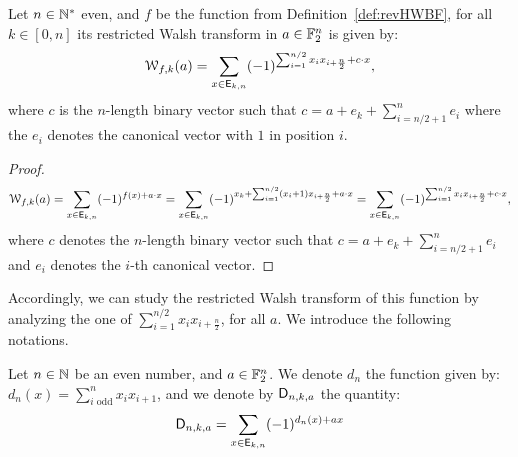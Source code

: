 \documentclass[11pt]{llncs}
\begin{document}
\begin{proposition}\label{prop:restrWT}
Let $n \in \mathbb{N}^*$ even, and $f$ be the function from Definition~\ref{def:revHWBF}, for all $k\in [0,n]$ its restricted Walsh transform in $a\in \mathbb{F}_2^n$ is given by:
\[\mathcal{W}_{f,k}(a)=\sum_{x \in \mathsf{E}_{k,n}} (-1)^{\sum_{i=1}^{n/2} x_i x_{i+\frac{n}{2}}+ c \cdot x},\]
where $c$ is the $n$-length binary vector such that $c=a+e_k+\sum_{i=n/2+1}^n e_i$ where the $e_i$ denotes the canonical vector with $1$ in position $i$.
\end{proposition}
\begin{proof}
\[	\mathcal{W}_{f,k}(a)=\sum_{x \in \mathsf{E}_{k,n}} (-1)^{f(x)+a \cdot x}
	=\sum_{x \in \mathsf{E}_{k,n}} (-1)^{x_k + \sum_{i=1}^{n/2} (x_i+1) x_{i+\frac{n}{2}}+ a \cdot x}\\
	=\sum_{x \in \mathsf{E}_{k,n}} (-1)^{\sum_{i=1}^{n/2} x_i x_{i+\frac{n}{2}}+ c \cdot x},\]
where $c$ denotes the $n$-length binary vector such that $c=a+e_k+\sum_{i=n/2+1}^n e_i$ and $e_i$ denotes the $i$-th canonical vector.
\end{proof}


Accordingly, we can study the restricted Walsh transform of this function by analyzing the one of $\sum_{i=1}^{n/2} x_i x_{i+\frac{n}{2}}$, for all $a$. We introduce the following notations.

\begin{definition}
Let $n\in \mathbb{N}$ be an even number, and $a\in \mathbb{F}_2^n$. We denote $d_n$ the function given by: $d_n(x)=\sum_{i \text{ odd}}^n x_i x_{i+1}$, 
and we denote by $\mathsf{D}_{n,k,a}$ the quantity:
\[\mathsf{D}_{n,k,a}= \sum_{x\in \mathsf{E}_{k,n}} (-1)^{d_n(x) +a x}\]
\end{definition}
\end{document}
